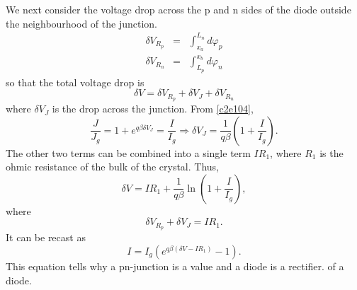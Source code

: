 We next consider the voltage drop across the p and n sides of the diode outside
the neighbourhood of the junction. 
\begin{eqnarray}
\delta V_{R_p} &=& \int_{x_a}^{L_n}d\varphi_p \label{c2e105} \\
\delta V_{R_n} &=& \int_{L_p}^{x_b}d\varphi_n \label{c2e106}
\end{eqnarray}
so that the total voltage drop is
\[
\delta V = \delta V_{R_p} + \delta V_J + \delta V_{R_n}
\]
where $\delta V_J$ is the drop across the junction. From \eqref{c2e104},
\[
\frac{J}{J_g} = 1 + e^{q\beta\delta V_J} = \frac{I}{I_g} \Rightarrow 
\delta V_J = \frac{1}{q\beta}\left(1 + \frac{I}{I_g}\right).
\]
The other two terms can be combined into a single term $IR_1$, where $R_1$
is the ohmic resistance of the bulk of the crystal. Thus,
\begin{equation}\label{c2e107}
\delta V = IR_1 + \frac{1}{q\beta}\ln\left(1 + \frac{I}{I_g}\right),
\end{equation}
where
\begin{equation}\label{c2e108}
\delta V_{R_p} + \delta V_J = IR_1.
\end{equation}
It can be recast as
\begin{equation}\label{c2e109}
I = I_g\left(e^{q\beta(\delta V - IR_1)} - 1\right).
\end{equation}
This equation tells why a pn-junction is a value and a diode is a rectifier.
of a diode.

